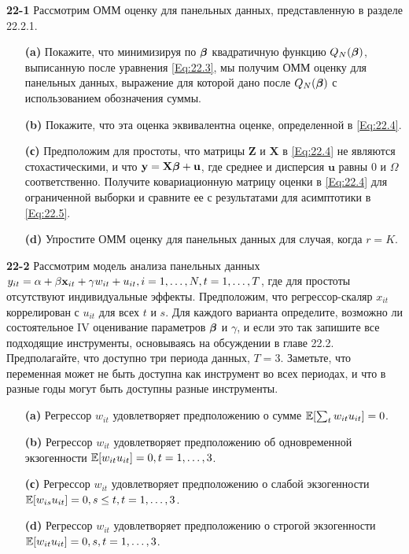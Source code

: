 \textbf{22-1} Рассмотрим ОММ оценку для панельных данных, представленную в разделе 22.2.1.
\begin{itemize}
\item[{\bf (a)}] Покажите, что минимизируя по $\bm{\beta}$  квадратичную функцию $Q_N(\bm{\beta})$, выписанную после уравнения \ref{Eq:22.3}, мы получим ОММ оценку для панельных данных, выражение для которой дано после $Q_N(\bm{\beta})$ с использованием обозначения суммы.
\item[{\bf (b)}] Покажите, что эта оценка эквивалентна оценке, определенной в \ref{Eq:22.4}.
\item[{\bf (с)}] Предположим для простоты, что матрицы $\mathbf Z$ и $\mathbf X$ в \ref{Eq:22.4} не являются стохастическими, и что $\mathbf y = \mathbf X \bm{\bm{\beta}} + \mathbf u$, где среднее и дисперсия $\mathbf u$ равны $0$ и $\Omega$ соответственно. Получите ковариационную матрицу оценки в \ref{Eq:22.4} для ограниченной выборки и сравните ее с результатами для асимптотики в \ref{Eq:22.5}.
\item[{\bf (d)}] Упростите ОММ оценку для панельных данных для случая, когда $r=K$.
\end{itemize}

\textbf{22-2} Рассмотрим модель анализа панельных данных $y_{it}=\alpha + \beta \mathbf{x}_{it}+\gamma w_{it}+u_{it}, i=1, \dots, N, t=1, \dots, T$, где для простоты отсутствуют индивидуальные эффекты. Предположим, что регрессор-скаляр $x_{it}$  коррелирован с $u_{it}$ для всех $t$ и $s$. Для каждого варианта определите, возможно ли состоятельное IV оценивание параметров $\bm{\beta}$ и $\gamma$, и если это так запишите все подходящие инструменты, основываясь на обсуждении в главе 22.2. Предполагайте, что доступно три периода данных, $T=3$. Заметьте, что переменная может не быть доступна как инструмент во всех периодах, и что в разные годы могут быть доступны разные инструменты.
\begin{itemize}
\item[{\bf (a)}] Регрессор $w_{it}$ удовлетворяет предположению о сумме $\mathbb{E}[\sum_t w_{it} u_{it}]=0$.
\item[{\bf (b)}] Регрессор $w_{it}$ удовлетворяет предположению об одновременной экзогенности $\mathbb{E}[w_{it} u_{it}]=0, t=1, \dots, 3$.
\item[{\bf (с)}] Регрессор $w_{it}$ удовлетворяет предположению о слабой экзогенности $\mathbb{E}[w_{is} u_{it}]=0, s \leq t, t=1, \dots, 3$.
\item[{\bf (d)}] Регрессор $w_{it}$ удовлетворяет предположению о строгой экзогенности $\mathbb{E}[w_{it} u_{it}]=0, s, t=1, \dots, 3$.
\end{itemize}

